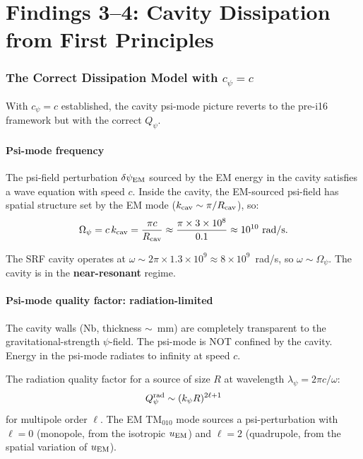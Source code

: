 \documentclass[11pt]{article}
\newcommand{\ee}[1]{\times 10^{#1}}
\newcommand{\dpsi}{\delta\psi}
\newcommand{\Opsi}{\Omega_\psi}
\newcommand{\Qpsi}{Q_\psi}
\theoremstyle{definition}
\theoremstyle{remark}
\begin{document}
\part{Findings 3--4: Cavity Dissipation from First Principles}
\label{part:dissipation}


\section{The Correct Dissipation Model with $c_\psi = c$}

With $c_\psi = c$ established, the cavity psi-mode picture reverts to
the pre-i16 framework but with the correct $\Qpsi$.

\subsection{Psi-mode frequency}

The psi-field perturbation $\dpsi_{\rm EM}$ sourced by the EM energy in
the cavity satisfies a wave equation with speed $c$. Inside the cavity,
the EM-sourced psi-field has spatial structure set by the EM mode
($k_{\rm cav} \sim \pi/R_{\rm cav}$), so:
\begin{equation}
\Opsi = c\,k_{\rm cav} = \frac{\pi c}{R_{\rm cav}}
\approx \frac{\pi \times 3\ee{8}}{0.1} \approx 10^{10}~\text{rad/s}.
\end{equation}

The SRF cavity operates at $\omega \sim 2\pi \times 1.3\ee{9}
\approx 8\ee{9}$~rad/s, so $\omega \sim \Opsi$. The cavity is in
the \textbf{near-resonant} regime.

\subsection{Psi-mode quality factor: radiation-limited}

The cavity walls (Nb, thickness $\sim$~mm) are completely transparent to
the gravitational-strength $\psi$-field. The psi-mode is NOT confined
by the cavity. Energy in the psi-mode radiates to infinity at speed $c$.

The radiation quality factor for a source of size $R$ at wavelength
$\lambda_\psi = 2\pi c/\omega$:
\begin{equation}
\Qpsi^{\rm rad} \sim (k_\psi R)^{2\ell+1}
\end{equation}
for multipole order $\ell$. The EM TM$_{010}$ mode sources a
psi-perturbation with $\ell = 0$ (monopole, from the isotropic
$u_{\rm EM}$) and $\ell = 2$ (quadrupole, from the spatial variation
of $u_{\rm EM}$).
\end{document}
